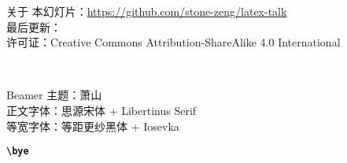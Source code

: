 \begin{frame}{关于}
\vspace*{1.2cm}
\footnotesize
本幻灯片：\url{https://github.com/stone-zeng/latex-talk} \\
最后更新：\DTMnow \\
许可证：Creative Commons Attribution-ShareAlike 4.0 International
\vspace{0.4cm}
\begin{center}
  \huge
  \faCreativeCommons\,\faCreativeCommonsBy\,\faCreativeCommonsSa
\end{center}
\vspace{2cm}
\begin{flushleft}
  \tiny
  Beamer 主题：萧山  \\
  正文字体：思源宋体 + Libertinus Serif \\
  等宽字体：等距更纱黑体 + Iosevka
\end{flushleft}
\vspace{-0.5cm}
\end{frame}

\begin{frame}[standout]
  \huge \textbf{\texttt{\textbackslash bye}}
\end{frame}

